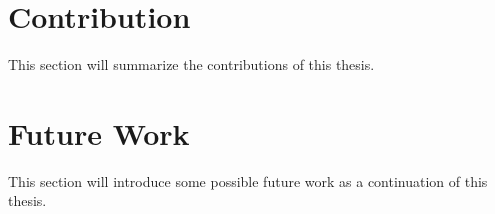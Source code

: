 \section{Contribution}

This section will summarize the contributions of this thesis.

\section{Future Work}

This section will introduce some possible future work as a continuation of this thesis.